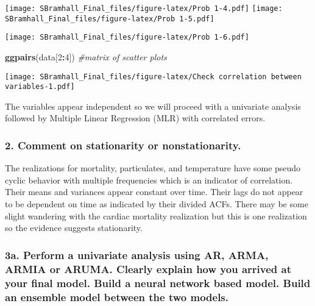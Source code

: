 \documentclass[]{article}
\newenvironment{Shaded}{\begin{snugshade}}{\end{snugshade}}
\newcommand{\KeywordTok}[1]{\textcolor[rgb]{0.13,0.29,0.53}{\textbf{#1}}}
\newcommand{\DecValTok}[1]{\textcolor[rgb]{0.00,0.00,0.81}{#1}}
\newcommand{\CommentTok}[1]{\textcolor[rgb]{0.56,0.35,0.01}{\textit{#1}}}
\newcommand{\OperatorTok}[1]{\textcolor[rgb]{0.81,0.36,0.00}{\textbf{#1}}}
\newcommand{\NormalTok}[1]{#1}
\begin{document}
\texttt{[image: SBramhall\_Final\_files/figure-latex/Prob 1-4.pdf]}
\texttt{[image: SBramhall\_Final\_files/figure-latex/Prob 1-5.pdf]}

\begin{Shaded}
\end{Shaded}

\texttt{[image: SBramhall\_Final\_files/figure-latex/Prob 1-6.pdf]}

\begin{Shaded}
\begin{Highlighting}[]
\KeywordTok{ggpairs}\NormalTok{(data[}\DecValTok{2}\OperatorTok{:}\DecValTok{4}\NormalTok{]) }\CommentTok{#matrix of scatter plots}
\end{Highlighting}
\end{Shaded}

\texttt{[image: SBramhall\_Final\_files/figure-latex/Check correlation between variables-1.pdf]}

 The variables appear independent so we will proceed with a univariate
analysis followed by Multiple Linear Regression (MLR) with correlated
errors.

\subsubsection{2. Comment on stationarity or
nonstationarity.}\label{comment-on-stationarity-or-nonstationarity.}

 The realizations for mortality, particulates, and temperature have some
pseudo cyclic behavior with multiple frequencies which is an indicator
of correlation. Their means and variances appear constant over time.
Their lags do not appear to be dependent on time as indicated by their
divided ACFs. There may be some slight wandering with the cardiac
mortality realization but this is one realization so the evidence
suggests stationarity.

\subsubsection{3a. Perform a univariate analysis using AR, ARMA, ARMIA
or ARUMA. Clearly explain how you arrived at your final model. Build a
neural network based model. Build an ensemble model between the two
models.}\label{a.-perform-a-univariate-analysis-using-ar-arma-armia-or-aruma.-clearly-explain-how-you-arrived-at-your-final-model.-build-a-neural-network-based-model.-build-an-ensemble-model-between-the-two-models.}
\end{document}
